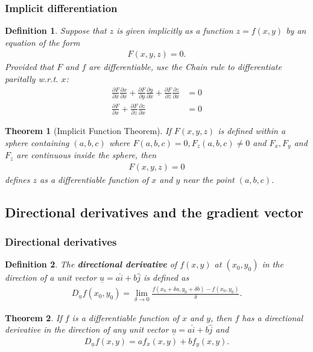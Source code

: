 \documentclass{article}
\theoremstyle{sltheorem}
\newtheorem{definition}{Definition}[section]
\newtheorem{theorem}{Theorem}[section]
\newcommand{\ih}{\widehat i}
\newcommand{\jh}{\widehat j}
\newcommand{\p}{\partial}
\renewcommand{\vec}{\underline}
\newcommand*\B[1]{\textbf{#1}}
\begin{document}
\subsubsection{Implicit differentiation}
\begin{definition}
    Suppose that $z$ is given implicitly as a function $z=f(x,y)$ by an
    equation of the form
    \begin{align*}
        F(x,y,z)=0.
    \end{align*}
    Provided that $F$ and $f$ are differentiable, use the Chain rule to
    differentiate paritally w.r.t. $x$:
    \begin{align*}
        \frac{\p F}{\p x}\frac{\p x}{\p x}+\frac{\p F}{\p y}\frac{\p y}{\p x}
        + \frac{\p F}{\p z}\frac{\p z}{\p x} &= 0\\
        \frac{\p F}{\p x} + \frac{\p F}{\p z}\frac{\p z}{\p x} &= 0
    \end{align*}
\end{definition}
\begin{theorem}[Implicit Function Theorem]
    If $F(x,y,z)$ is defined within a sphere containing $(a,b,c)$
    where $F(a,b,c)=0, F_z(a,b,c)\not=0$ and $F_x,F_y$ and $F_z$ are
    continuous inside the sphere, then
    \begin{align*}
        F(x,y,z)=0
    \end{align*} 
    defines $z$ as a differentiable function of $x$ and $y$ near the
    point $(a,b,c)$.
\end{theorem}
\subsection{Directional derivatives and the gradient vector}
\subsubsection{Directional derivatives}
\begin{definition}
    The \B{directional derivative} of $f(x,y)$ at $(x_0,y_0)$ in the
    direction of a \emph{unit vector} $\vec u=a\ih + b\jh$ is defined as
    \begin{align*}
        D_{\vec u}f(x_0, y_0)=\lim_{\delta \to 0}
        \frac{f(x_0+\delta a, y_0 + \delta b)-f(x_0, y_0)}{\delta}.
    \end{align*}
\end{definition}
\begin{theorem}
    If $f$ is a differentiable function of $x$ and $y$, then $f$
    has a directional derivative in the direction of any unit vector
    $\vec u=a\ih + b\jh$ and
    \begin{align*}
        D_{\vec u}f(x,y) = af_x(x,y) + bf_y(x,y).
    \end{align*}
\end{theorem}
\end{document}
